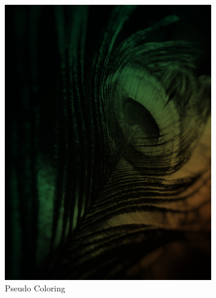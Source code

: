 \documentclass[a4paper]{article}
\begin{document}
\begin{figure}[H]
\begin{subfigure}[b]{.225\textwidth}
        \includegraphics[width=\textwidth]{output/feather_pseudo_colored.jpg}
        \caption{Pseudo Coloring}
    \end{subfigure}
    \hfill
    \begin{subfigure}[b]{.225\textwidth}
        \centering

\end{subfigure}
\end{figure}
\end{document}
